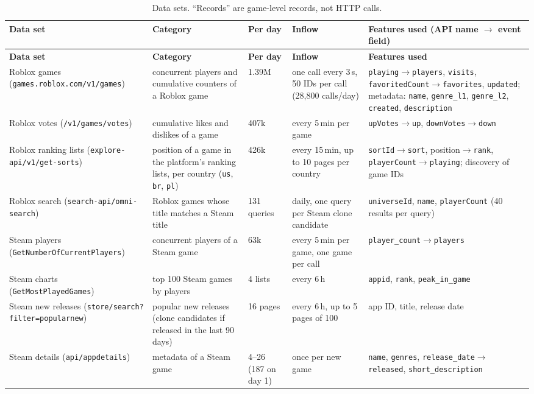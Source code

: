 \documentclass[10pt,a4paper]{article}
\newcommand{\ep}[1]{\texttt{\small #1}}
\newcommand{\eu}[1]{{\small\nolinkurl{#1}}}
\begin{document}
{\small
\begin{longtable}{L{2.2cm} L{2.8cm} L{1.6cm} L{2.1cm} L{6.1cm}}
\caption{Data sets. ``Records'' are game-level records, not HTTP calls.}\label{tab:datasets}\\
\toprule
\textbf{Data set} & \textbf{Category} & \textbf{Per day} & \textbf{Inflow} & \textbf{Features used (API name $\rightarrow$ event field)}\\
\midrule\endfirsthead
\toprule
\textbf{Data set} & \textbf{Category} & \textbf{Per day} & \textbf{Inflow} & \textbf{Features used}\\
\midrule\endhead
Roblox games (\eu{games.roblox.com/v1/games}) & concurrent players and cumulative counters of a Roblox game & 1.39M & one call every 3\,s, 50 IDs per call (28,800 calls/day) & \ep{playing}$\rightarrow$\ep{players}, \ep{visits}, \ep{favoritedCount}$\rightarrow$\ep{favorites}, \ep{updated}; metadata: \ep{name}, \ep{genre\_l1}, \ep{genre\_l2}, \ep{created}, \ep{description}\\
Roblox votes (\eu{/v1/games/votes}) & cumulative likes and dislikes of a game & 407k & every 5\,min per game & \ep{upVotes}$\rightarrow$\ep{up}, \ep{downVotes}$\rightarrow$\ep{down}\\
Roblox ranking lists (\eu{explore-api/v1/get-sorts}) & position of a game in the platform's ranking lists, per country (\ep{us}, \ep{br}, \ep{pl}) & 426k & every 15\,min, up to 10 pages per country & \ep{sortId}$\rightarrow$\ep{sort}, position$\rightarrow$\ep{rank}, \ep{playerCount}$\rightarrow$\ep{playing}; discovery of game IDs\\
Roblox search (\eu{search-api/omni-search}) & Roblox games whose title matches a Steam title & 131 queries & daily, one query per Steam clone candidate & \ep{universeId}, \ep{name}, \ep{playerCount} (40 results per query)\\
Steam players (\eu{GetNumberOfCurrentPlayers}) & concurrent players of a Steam game & 63k & every 5\,min per game, one game per call & \ep{player\_count}$\rightarrow$\ep{players}\\
Steam charts (\eu{GetMostPlayedGames}) & top 100 Steam games by players & 4 lists & every 6\,h & \ep{appid}, \ep{rank}, \ep{peak\_in\_game}\\
Steam new releases (\eu{store/search?filter=popularnew}) & popular new releases (clone candidates if released in the last 90 days) & 16 pages & every 6\,h, up to 5 pages of 100 & app ID, title, release date\\
Steam details (\eu{api/appdetails}) & metadata of a Steam game & 4--26 (187 on day 1) & once per new game & \ep{name}, \ep{genres}, \ep{release\_date}$\rightarrow$\ep{released}, \ep{short\_description}\\
\bottomrule
\end{longtable}}
\end{document}
